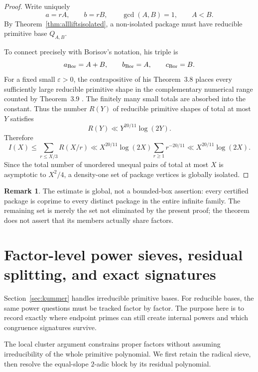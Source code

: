 \documentclass[11pt]{article}
\numberwithin{equation}{section}
\theoremstyle{definition}
\newtheorem{remark}[theorem]{Remark}
\begin{document}
\begin{proof}
Write uniquely
\[
 a=rA,\qquad b=rB,
 \qquad\gcd(A,B)=1,
 \qquad A<B.
\]
By Theorem~\ref{thm:allliftsisolated}, a non-isolated package must have
reducible primitive base \(Q_{A,B}\).

To connect precisely with Borisov's notation, his triple is
\[
 a_{\rm Bor}=A+B,
 \qquad b_{\rm Bor}=A,
 \qquad c_{\rm Bor}=B.
\]
For a fixed small \(\varepsilon>0\), the contrapositive of his
Theorem~3.8 places every sufficiently large reducible primitive shape in the
complementary numerical range counted by Theorem~3.9 \cite{Borisov1998}.  The finitely many
small totals are absorbed into the constant.  Thus the number \(R(Y)\) of
reducible primitive shapes of total at most \(Y\) satisfies
\begin{equation}
 R(Y)\ll Y^{20/11}\log(2Y).
 \label{eq:14-11}
\end{equation}
Therefore
\[
 I(X)\leq\sum_{r\leq X/3}R(X/r)
 \ll X^{20/11}\log(2X)
 \sum_{r\geq1}r^{-20/11}
 \ll X^{20/11}\log(2X).
\]
Since the total number of unordered unequal pairs of total at most \(X\) is
asymptotic to \(X^2/4\), a density-one set of package vertices is globally
isolated.
\end{proof}

\begin{remark}
The estimate is global, not a bounded-box assertion: every certified package
is coprime to every distinct package in the entire infinite family.  The
remaining set is merely the set not eliminated by the present proof; the
theorem does not assert that its members actually share factors.
\end{remark}

\section{Factor-level power sieves, residual splitting, and exact signatures}

Section~\ref{sec:kummer} handles irreducible primitive bases.  For reducible bases, the same power questions must be tracked factor by factor.  The purpose here is to record exactly where endpoint primes can still create internal powers and which congruence signatures survive.
\label{sec:degreesieve}

The local cluster argument constrains proper factors without assuming
irreducibility of the whole primitive polynomial.  We first retain the
radical sieve, then resolve the equal-slope \(2\)-adic block by its residual
polynomial.
\end{document}
